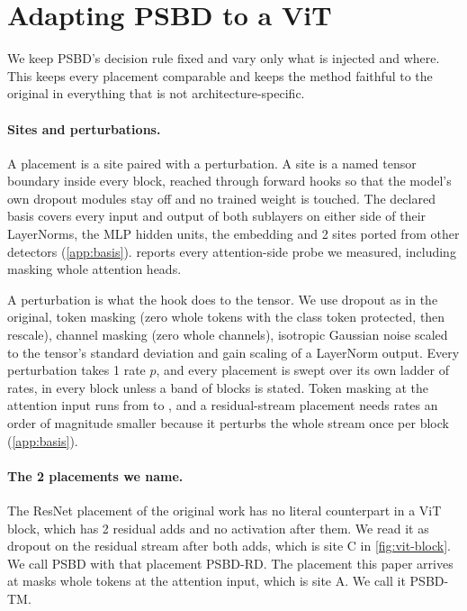 \section{Adapting PSBD to a ViT}
\label{sec:method}

We keep PSBD's decision rule fixed and vary only what is injected and where. This keeps every placement comparable and keeps the method faithful to the original in everything that is not architecture-specific.

\paragraph{Sites and perturbations.}
A placement is a site paired with a perturbation. A site is a named tensor boundary inside every block, reached through forward hooks so that the model's own dropout modules stay off and no trained weight is touched. The declared basis covers every input and output of both sublayers on either side of their LayerNorms, the MLP hidden units, the embedding and 2 sites ported from other detectors (\cref{app:basis}).  reports every attention-side probe we measured, including masking whole attention heads.

A perturbation is what the hook does to the tensor. We use dropout as in the original, token masking (zero whole tokens with the class token protected, then rescale), channel masking (zero whole channels), isotropic Gaussian noise scaled to the tensor's standard deviation and gain scaling of a LayerNorm output. Every perturbation takes 1 rate $p$, and every placement is swept over its own ladder of rates, in every block unless a band of blocks is stated. Token masking at the attention input runs from \RecommendedRateLadderLow{} to \RecommendedRateLadderHigh{}, and a residual-stream placement needs rates an order of magnitude smaller because it perturbs the whole stream once per block (\cref{app:basis}).

\paragraph{The 2 placements we name.}
The ResNet placement of the original work has no literal counterpart in a ViT block, which has 2 residual adds and no activation after them. We read it as dropout on the residual stream after both adds, which is site C in \cref{fig:vit-block}. We call PSBD with that placement PSBD-RD. The placement this paper arrives at masks whole tokens at the attention input, which is site A. We call it PSBD-TM.

